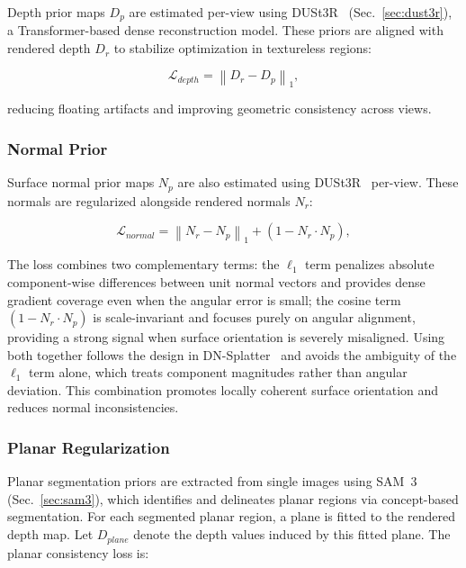 Depth prior maps $D_p$ are estimated per-view using DUSt3R~\cite{dust3r} (Sec.~\ref{sec:dust3r}), a Transformer-based dense reconstruction model. These priors are aligned with rendered depth $D_r$ to stabilize optimization in textureless regions:

\begin{equation}
\mathcal{L}_{depth}
=
\left\|
D_r - D_p
\right\|_1,
\end{equation}

reducing floating artifacts and improving geometric consistency across views.

\subsubsection{Normal Prior}
\label{sec:normal_prior}

Surface normal prior maps $N_p$ are also estimated using DUSt3R~\cite{dust3r} per-view. These normals are regularized alongside rendered normals $N_r$:

\begin{equation}
\mathcal{L}_{normal}
=
\left\|
N_r - N_p
\right\|_1
+
\left(1 - N_r \cdot N_p \right),
\end{equation}

The loss combines two complementary terms: the $\ell_1$ term penalizes absolute component-wise differences between unit normal vectors and provides dense gradient coverage even when the angular error is small; the cosine term $(1 - N_r \cdot N_p)$ is scale-invariant and focuses purely on angular alignment, providing a strong signal when surface orientation is severely misaligned. Using both together follows the design in DN-Splatter~\cite{dn_splatter} and avoids the ambiguity of the $\ell_1$ term alone, which treats component magnitudes rather than angular deviation. This combination promotes locally coherent surface orientation and reduces normal inconsistencies.

\subsubsection{Planar Regularization}
\label{sec:planar_prior}

Planar segmentation priors are extracted from single images using SAM~3~\cite{sam3} (Sec.~\ref{sec:sam3}), which identifies and delineates planar regions via concept-based segmentation. For each segmented planar region, a plane is fitted to the rendered depth map. Let $D_{plane}$ denote the depth values induced by this fitted plane. The planar consistency loss is:

